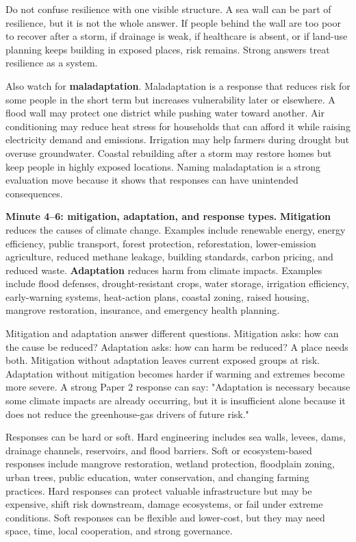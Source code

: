 \documentclass[11pt,a4paper]{article}
\newcommand{\term}[1]{\textcolor{HeadingBlue}{\textbf{#1}}}
\begin{document}
Do not confuse resilience with one visible structure. A sea wall can be part of
resilience, but it is not the whole answer. If people behind the wall are too
poor to recover after a storm, if drainage is weak, if healthcare is absent, or
if land-use planning keeps building in exposed places, risk remains. Strong
answers treat resilience as a system.

Also watch for \term{maladaptation}. Maladaptation is a response that reduces
risk for some people in the short term but increases vulnerability later or
elsewhere. A flood wall may protect one district while pushing water toward
another. Air conditioning may reduce heat stress for households that can afford
it while raising electricity demand and emissions. Irrigation may help farmers
during drought but overuse groundwater. Coastal rebuilding after a storm may
restore homes but keep people in highly exposed locations. Naming maladaptation
is a strong evaluation move because it shows that responses can have unintended
consequences.

\textbf{Minute 4--6: mitigation, adaptation, and response types.}
\term{Mitigation} reduces the causes of climate change. Examples include
renewable energy, energy efficiency, public transport, forest protection,
reforestation, lower-emission agriculture, reduced methane leakage, building
standards, carbon pricing, and reduced waste. \term{Adaptation} reduces harm
from climate impacts. Examples include flood defenses, drought-resistant crops,
water storage, irrigation efficiency, early-warning systems, heat-action plans,
coastal zoning, raised housing, mangrove restoration, insurance, and emergency
health planning.

Mitigation and adaptation answer different questions. Mitigation asks: how can
the cause be reduced? Adaptation asks: how can harm be reduced? A place needs
both. Mitigation without adaptation leaves current exposed groups at risk.
Adaptation without mitigation becomes harder if warming and extremes become
more severe. A strong Paper 2 response can say: "Adaptation is necessary
because some climate impacts are already occurring, but it is insufficient
alone because it does not reduce the greenhouse-gas drivers of future risk."

Responses can be hard or soft. Hard engineering includes sea walls, levees,
dams, drainage channels, reservoirs, and flood barriers. Soft or ecosystem-based
responses include mangrove restoration, wetland protection, floodplain zoning,
urban trees, public education, water conservation, and changing farming
practices. Hard responses can protect valuable infrastructure but may be
expensive, shift risk downstream, damage ecosystems, or fail under extreme
conditions. Soft responses can be flexible and lower-cost, but they may need
space, time, local cooperation, and strong governance.
\end{document}
